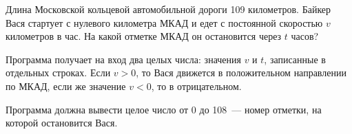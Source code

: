 Длина Московской кольцевой автомобильной дороги 109 километров.
Байкер Вася стартует с нулевого километра МКАД и едет с постоянной скоростью
$v$ километров в час. На какой отметке МКАД он остановится через $t$ часов?

\InputFile
Программа получает на вход два целых числа: значения $v$ и $t$,
записанные в отдельных строках. Если $v > 0$, то Вася движется
в положительном направлении по МКАД, если же значение $v < 0$, то в отрицательном.

\OutputFile
Программа должна вывести целое число от 0 до 108~--- номер отметки, на которой остановится Вася.
